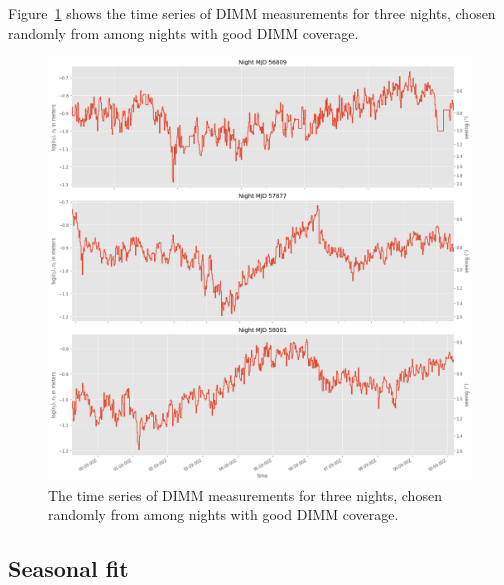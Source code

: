 \documentclass[\docopts]{\docclass}
\begin{document}


Figure~\ref{fig:random-nights-dimm} shows the time series of DIMM
measurements for three nights, chosen randomly from among nights with
good DIMM coverage. 

\begin{figure}
  \includegraphics[width=\columnwidth]{random_nights_dimm.png}
  \caption{The time series of DIMM
measurements for three nights, chosen randomly from among nights with
good DIMM coverage. }
  \label{fig:random-nights-dimm}
\end{figure}

\subsection{Seasonal fit}
\label{sec:seasonal}
\end{document}
